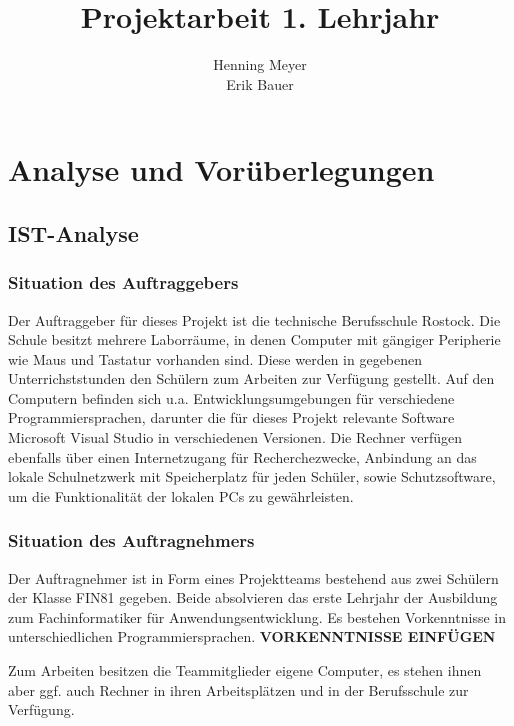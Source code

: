 \documentclass{article}
\title{Projektarbeit 1. Lehrjahr}
\author{Henning Meyer\\Erik Bauer}
\begin{document}

\maketitle
\newpage
\tableofcontents
\newpage


\section{Analyse und Vorüberlegungen}

\subsection{IST-Analyse}

\subsubsection{Situation des Auftraggebers}

    Der Auftraggeber für dieses Projekt ist die technische Berufsschule Rostock. Die Schule besitzt mehrere Laborräume, in denen Computer mit gängiger Peripherie wie Maus und Tastatur vorhanden sind. Diese werden in gegebenen Unterrichststunden den Schülern zum Arbeiten zur Verfügung gestellt.
    Auf den Computern befinden sich u.a. Entwicklungsumgebungen für verschiedene Programmiersprachen, darunter die für dieses Projekt relevante Software \glqq Microsoft Visual Studio\grqq{} in verschiedenen Versionen. Die Rechner verfügen ebenfalls über einen Internetzugang für Recherchezwecke, Anbindung an das lokale Schulnetzwerk mit Speicherplatz für jeden Schüler, sowie Schutzsoftware, um die Funktionalität der lokalen PCs zu gewährleisten.

\subsubsection{Situation des Auftragnehmers}

    Der Auftragnehmer ist in Form eines Projektteams bestehend aus zwei Schülern der Klasse FIN81 gegeben. Beide absolvieren das erste Lehrjahr der Ausbildung zum Fachinformatiker für Anwendungsentwicklung. Es bestehen Vorkenntnisse in unterschiedlichen Programmiersprachen. 
    \textbf{VORKENNTNISSE EINFÜGEN}%

    Zum Arbeiten besitzen die Teammitglieder eigene Computer, es stehen ihnen aber ggf. auch Rechner in ihren Arbeitsplätzen und in der Berufsschule zur Verfügung.
\end{document}
